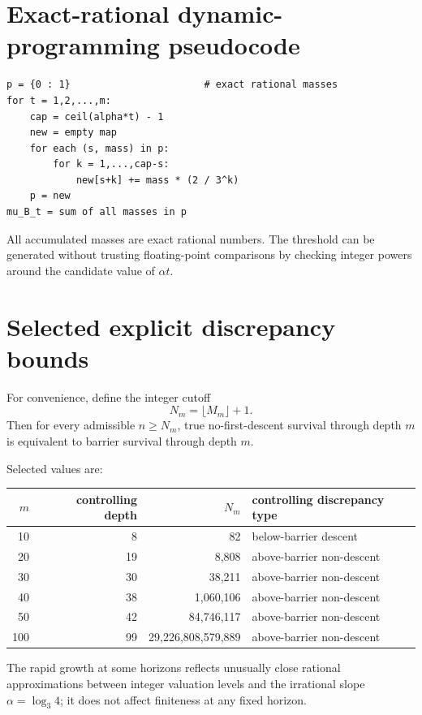 \documentclass[11pt]{article}
\theoremstyle{definition}
\theoremstyle{remark}
\begin{document}
\appendix

\section{Exact-rational dynamic-programming pseudocode}

\begin{verbatim}
p = {0 : 1}                       # exact rational masses
for t = 1,2,...,m:
    cap = ceil(alpha*t) - 1
    new = empty map
    for each (s, mass) in p:
        for k = 1,...,cap-s:
            new[s+k] += mass * (2 / 3^k)
    p = new
mu_B_t = sum of all masses in p
\end{verbatim}

All accumulated masses are exact rational numbers.  The threshold can be generated without trusting floating-point comparisons by checking integer powers around the candidate value of $\alpha t$.

\section{Selected explicit discrepancy bounds}

For convenience, define the integer cutoff
\[
N_m=\lfloor M_m\rfloor+1.
\]
Then for every admissible $n\ge N_m$, true no-first-descent survival through depth $m$ is equivalent to barrier survival through depth $m$.

Selected values are:
\begin{center}
\begin{tabular}{r r r l}
\toprule
$m$ & controlling depth & $N_m$ & controlling discrepancy type \\
\midrule
10  & 8   & 82 & below-barrier descent \\
20  & 19  & 8,808 & above-barrier non-descent \\
30  & 30  & 38,211 & above-barrier non-descent \\
40  & 38  & 1,060,106 & above-barrier non-descent \\
50  & 42  & 84,746,117 & above-barrier non-descent \\
100 & 99  & 29,226,808,579,889 & above-barrier non-descent \\
\bottomrule
\end{tabular}
\end{center}

The rapid growth at some horizons reflects unusually close rational approximations between integer valuation levels and the irrational slope $\alpha=\log_3 4$; it does not affect finiteness at any fixed horizon.
\end{document}
